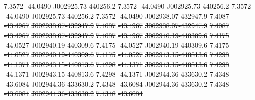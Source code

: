 \documentclass[11pt, a4paper]{book}
\providecommand{\DIFdeltex}[1]{{\protect\color{red}\sout{#1}}}                      %
\providecommand{\DIFdel}[1]{\texorpdfstring{\DIFdeltex{#1}}{}} %
\begin{document}
\DIFdel{7.3572 }%
\DIFdel{-44.0490 }%
\DIFdel{J002925.73-440256.2 }%
\DIFdel{7.3572 }%
\DIFdel{-44.0490 }%
\DIFdel{J002925.73-440256.2 }%
\DIFdel{7.3572 }%
\DIFdel{-44.0490 }%
\DIFdel{J002925.73-440256.2 }%
\DIFdel{7.3572 }%
\DIFdel{-44.0490 }%
\DIFdel{J002938.07-432947.9 }%
\DIFdel{7.4087 }%
\DIFdel{-43.4967 }%
\DIFdel{J002938.07-432947.9 }%
\DIFdel{7.4087 }%
\DIFdel{-43.4967 }%
\DIFdel{J002938.07-432947.9 }%
\DIFdel{7.4087 }%
\DIFdel{-43.4967 }%
\DIFdel{J002938.07-432947.9 }%
\DIFdel{7.4087 }%
\DIFdel{-43.4967 }%
\DIFdel{J002940.19-440309.6 }%
\DIFdel{7.4175 }%
\DIFdel{-44.0527 }%
\DIFdel{J002940.19-440309.6 }%
\DIFdel{7.4175 }%
\DIFdel{-44.0527 }%
\DIFdel{J002940.19-440309.6 }%
\DIFdel{7.4175 }%
\DIFdel{-44.0527 }%
\DIFdel{J002940.19-440309.6 }%
\DIFdel{7.4175 }%
\DIFdel{-44.0527 }%
\DIFdel{J002943.15-440813.6 }%
\DIFdel{7.4298 }%
\DIFdel{-44.1371 }%
\DIFdel{J002943.15-440813.6 }%
\DIFdel{7.4298 }%
\DIFdel{-44.1371 }%
\DIFdel{J002943.15-440813.6 }%
\DIFdel{7.4298 }%
\DIFdel{-44.1371 }%
\DIFdel{J002943.15-440813.6 }%
\DIFdel{7.4298 }%
\DIFdel{-44.1371 }%
\DIFdel{J002944.36-433630.2 }%
\DIFdel{7.4348 }%
\DIFdel{-43.6084 }%
\DIFdel{J002944.36-433630.2 }%
\DIFdel{7.4348 }%
\DIFdel{-43.6084 }%
\DIFdel{J002944.36-433630.2 }%
\DIFdel{7.4348 }%
\DIFdel{-43.6084 }%
\DIFdel{J002944.36-433630.2 }%
\DIFdel{7.4348 }%
\DIFdel{-43.6084 }%
\end{document}

